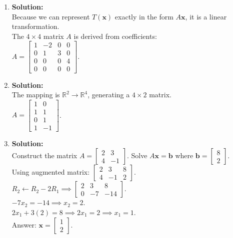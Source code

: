 \documentclass[12pt]{article}
\begin{document}
\begin{enumerate}
    \item \textbf{Solution:}\\
    Because we can represent $T(\mathbf{x})$ exactly in the form $A\mathbf{x}$, it is a linear transformation. \\
    The $4 \times 4$ matrix $A$ is derived from coefficients: \\
    $A = \begin{bmatrix} 1 & -2 & 0 & 0 \\ 0 & 1 & 3 & 0 \\ 0 & 0 & 0 & 4 \\ 0 & 0 & 0 & 0 \end{bmatrix}$.

    \item \textbf{Solution:}\\
    The mapping is $\mathbb{R}^2 \rightarrow \mathbb{R}^4$, generating a $4 \times 2$ matrix. \\
    $A = \begin{bmatrix} 1 & 0 \\ 1 & 1 \\ 0 & 1 \\ 1 & -1 \end{bmatrix}$.

    \item \textbf{Solution:}\\
    Construct the matrix $A = \begin{bmatrix} 2 & 3 \\ 4 & -1 \end{bmatrix}$. Solve $A\mathbf{x} = \mathbf{b}$ where $\mathbf{b} = \begin{bmatrix} 8 \\ 2 \end{bmatrix}$. \\
    Using augmented matrix: $\left[\begin{array}{cc|c} 2 & 3 & 8 \\ 4 & -1 & 2 \end{array}\right]$. \\
    $R_2 \leftarrow R_2 - 2R_1 \implies \left[\begin{array}{cc|c} 2 & 3 & 8 \\ 0 & -7 & -14 \end{array}\right]$. \\
    $-7x_2 = -14 \implies x_2 = 2$. \\
    $2x_1 + 3(2) = 8 \implies 2x_1 = 2 \implies x_1 = 1$. \\
    Answer: $\mathbf{x} = \begin{bmatrix} 1 \\ 2 \end{bmatrix}$.


\end{enumerate}
\end{document}
